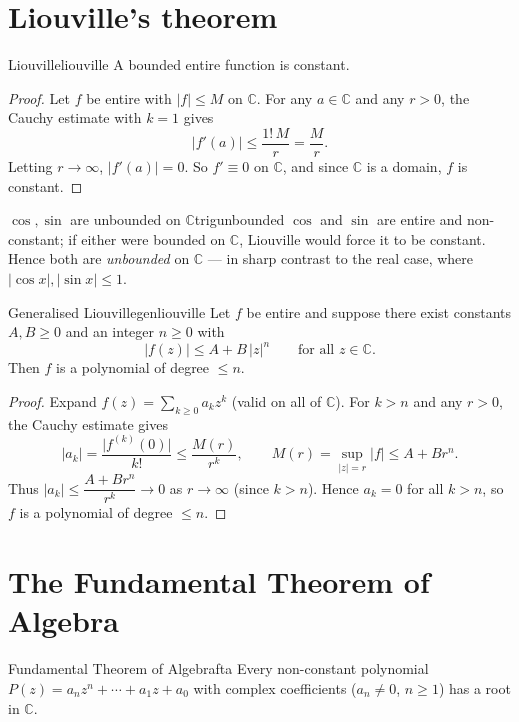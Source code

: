 \documentclass[11pt,openany]{report}
\newcommand{\C}{\mathbb{C}}
\newcommand{\abs}[1]{\left\lvert #1 \right\rvert}
\begin{document}
\section{Liouville's theorem}

\begin{theorem}{Liouville}{liouville}
A bounded entire function is constant.
\end{theorem}

\begin{proof}
Let $f$ be entire with $\abs{f}\le M$ on $\C$. For any $a\in\C$ and any $r>0$, the Cauchy
estimate with $k=1$ gives
\[
  \abs{f'(a)} \le \frac{1!\,M}{r} = \frac{M}{r}.
\]
Letting $r\to\infty$, $\abs{f'(a)}=0$. So $f'\equiv0$ on $\C$, and since $\C$ is a domain,
$f$ is constant.
\end{proof}

\begin{corollary}{$\cos,\sin$ are unbounded on $\C$}{trigunbounded}
$\cos$ and $\sin$ are entire and non-constant; if either were bounded on $\C$, Liouville
would force it to be constant. Hence both are \emph{unbounded} on $\C$ --- in sharp
contrast to the real case, where $\abs{\cos x},\abs{\sin x}\le1$.
\end{corollary}

\begin{theorem}{Generalised Liouville}{genliouville}
Let $f$ be entire and suppose there exist constants $A,B\ge0$ and an integer $n\ge0$ with
\[
  \abs{f(z)} \le A + B\,\abs{z}^{n} \qquad \text{for all } z\in\C .
\]
Then $f$ is a polynomial of degree $\le n$.
\end{theorem}

\begin{proof}
Expand $f(z)=\sum_{k\ge0}a_k z^k$ (valid on all of $\C$). For $k>n$ and any $r>0$, the
Cauchy estimate gives
\[
  \abs{a_k} = \frac{\bigl\lvert f^{(k)}(0)\bigr\rvert}{k!}
  \le \frac{M(r)}{r^{k}}, \qquad M(r)=\sup_{\abs z=r}\abs{f}\le A+B r^{n}.
\]
Thus $\abs{a_k}\le\dfrac{A+Br^{n}}{r^{k}}\to0$ as $r\to\infty$ (since $k>n$). Hence
$a_k=0$ for all $k>n$, so $f$ is a polynomial of degree $\le n$.
\end{proof}

\section{The Fundamental Theorem of Algebra}

\begin{theorem}{Fundamental Theorem of Algebra}{fta}
Every non-constant polynomial $P(z)=a_n z^n+\cdots+a_1 z+a_0$ with complex coefficients
($a_n\ne0$, $n\ge1$) has a root in $\C$.
\end{theorem}
\end{document}
